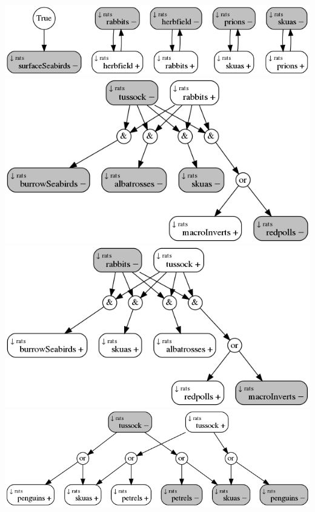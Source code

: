 \documentclass[11pt]{article}
\makeatletter
\def\maxwidth{\ifdim\Gin@nat@width>\linewidth\linewidth
    \else\Gin@nat@width\fi}
\let\Oldincludegraphics\includegraphics
\renewcommand{\includegraphics}[1]{\Oldincludegraphics[width=.8\maxwidth]{#1}}
\makeatother
\begin{document}
\includegraphics{PCUList1_2.png} \includegraphics{PCUList3_1.png}
\includegraphics{PCUList4_1.png} \includegraphics{PCUList6_1.png}
\end{document}
